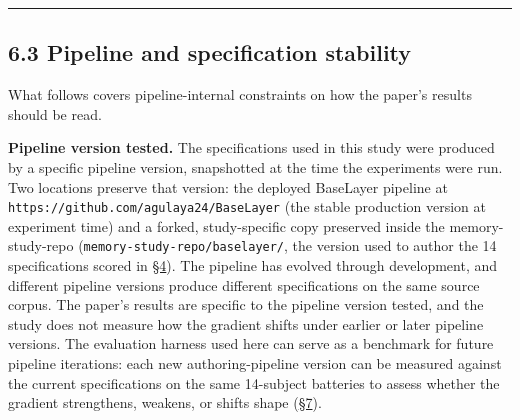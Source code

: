 \begin{center}\rule{0.5\linewidth}{0.5pt}\end{center}

\hypertarget{pipeline-and-specification-stability}{%
\subsection{6.3 Pipeline and specification
stability}\label{pipeline-and-specification-stability}}

What follows covers pipeline-internal constraints on how the paper's
results should be read.

\textbf{Pipeline version tested.} The specifications used in this study
were produced by a specific pipeline version, snapshotted at the time
the experiments were run. Two locations preserve that version: the
deployed BaseLayer pipeline at
\texttt{https://github.com/agulaya24/BaseLayer} (the stable production
version at experiment time) and a forked, study-specific copy preserved
inside the memory-study-repo (\texttt{memory-study-repo/baselayer/}, the
version used to author the 14 specifications scored in \hyperref[results]{§4}). The pipeline
has evolved through development, and different pipeline versions produce
different specifications on the same source corpus. The paper's results
are specific to the pipeline version tested, and the study does not
measure how the gradient shifts under earlier or later pipeline
versions. The evaluation harness used here can serve as a benchmark for
future pipeline iterations: each new authoring-pipeline version can be
measured against the current specifications on the same 14-subject
batteries to assess whether the gradient strengthens, weakens, or shifts
shape (\hyperref[future-work]{§7}).

